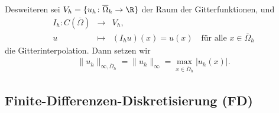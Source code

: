 Desweiteren sei $V_h = \{u_h \colon \overline\Omega_h \rightarrow \R\}$ der
Raum der Gitterfunktionen, und
\begin{eqnarray*}
    I_h \colon C(\overline\Omega) &\rightarrow& V_h, \\
    u &\mapsto& (I_h u)(x) = u(x) \quad \text{für alle } x\in
    \overline\Omega_h
\end{eqnarray*}
die Gitterinterpolation. Dann setzen wir
\begin{eqnarray*}
      \|u_h\|_{\infty, \overline\Omega_h}
    = \|u_h\|_\infty
    = \max_{x\in \overline\Omega_h} |u_h(x)|.
\end{eqnarray*}


\subsection{Finite-Differenzen-Diskretisierung (FD)}


